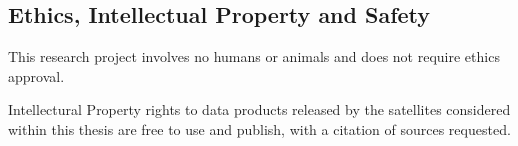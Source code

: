 \subsection{Ethics, Intellectual Property and Safety}
This research project involves no humans or animals and does not require ethics approval.

Intellectural Property rights to data products released by the satellites considered within this thesis are free to use and publish, with a citation of sources requested.